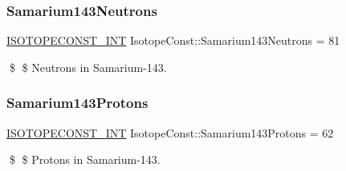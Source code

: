 \subsubsection{\texorpdfstring{Samarium143\+Neutrons}{Samarium143Neutrons}}
{\footnotesize\ttfamily \mbox{\hyperlink{group___isotope_const-_macros_ga5f18360b3e99483a35c32d789e62621c}{I\+S\+O\+T\+O\+P\+E\+C\+O\+N\+S\+T\+\_\+\+I\+NT}} Isotope\+Const\+::\+Samarium143\+Neutrons = 81}

\$ \$ Neutrons in Samarium-\/143. \mbox{\label{group___isotope_const-_samarium-_sm143_gaea47b187802a084d0b7893bf939ffbc3}} 
\subsubsection{\texorpdfstring{Samarium143\+Protons}{Samarium143Protons}}
{\footnotesize\ttfamily \mbox{\hyperlink{group___isotope_const-_macros_ga5f18360b3e99483a35c32d789e62621c}{I\+S\+O\+T\+O\+P\+E\+C\+O\+N\+S\+T\+\_\+\+I\+NT}} Isotope\+Const\+::\+Samarium143\+Protons = 62}

\$ \$ Protons in Samarium-\/143. 